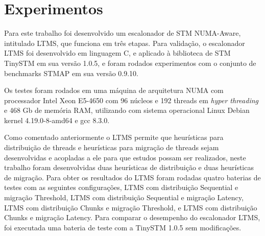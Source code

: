 \documentclass[diss,capa]{texufpel}
\begin{document}








\chapter{Experimentos}
\label{chapter::experimentos}

Para este trabalho foi desenvolvido um escalonador de STM NUMA-Aware, intitulado LTMS, que funciona em três etapas. Para validação, o escalonador LTMS foi desenvolvido em linguagem C, e aplicado à biblioteca de STM TinySTM em sua versão 1.0.5, e foram rodados experimentos com o conjunto de benchmarks STMAP em sua versão 0.9.10.

Os testes foram rodados em uma máquina de arquitetura NUMA com processador Intel Xeon E5-4650 com 96 núcleos e 192 threads em \emph{hyper threading} e 468 Gb de memória RAM, utilizando com sistema operacional Linux Debian kernel 4.19.0-8-amd64  e gcc 8.3.0.

Como comentado anteriormente o LTMS permite que heurísticas para distribuição de threads e heurísticas para migração de threads sejam desenvolvidas e acopladas a ele para que estudos possam ser realizados, neste trabalho foram desenvolvidas duas heurísticas de distribuição e duas heurísticas de migração. Para obter os resultados do LTMS foram rodadas quatro baterias de testes com as seguintes configurações, LTMS com distribuição Sequential e migração Threshold, LTMS com distribuição Sequential e migração Latency, LTMS com distribuição Chunks e migração Threshold, e LTMS com distribuição Chunks e migração Latency. Para comparar o desempenho do escalonador LTMS, foi executada uma bateria de teste com a TinySTM 1.0.5 sem modificações.
\end{document}
